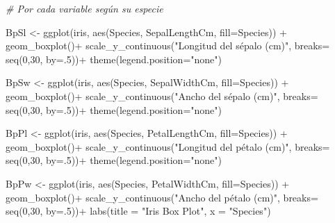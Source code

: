 \documentclass[
]{article}
\newenvironment{Shaded}{\begin{snugshade}}{\end{snugshade}}
\newcommand{\AttributeTok}[1]{\textcolor[rgb]{0.77,0.63,0.00}{#1}}
\newcommand{\CommentTok}[1]{\textcolor[rgb]{0.56,0.35,0.01}{\textit{#1}}}
\newcommand{\DecValTok}[1]{\textcolor[rgb]{0.00,0.00,0.81}{#1}}
\newcommand{\FunctionTok}[1]{\textcolor[rgb]{0.00,0.00,0.00}{#1}}
\newcommand{\NormalTok}[1]{#1}
\newcommand{\OtherTok}[1]{\textcolor[rgb]{0.56,0.35,0.01}{#1}}
\newcommand{\SpecialCharTok}[1]{\textcolor[rgb]{0.00,0.00,0.00}{#1}}
\newcommand{\StringTok}[1]{\textcolor[rgb]{0.31,0.60,0.02}{#1}}
\begin{document}
\begin{Shaded}
\begin{Highlighting}[]
\CommentTok{\# Por cada variable según su especie}

\NormalTok{BpSl }\OtherTok{\textless{}{-}} \FunctionTok{ggplot}\NormalTok{(iris, }\FunctionTok{aes}\NormalTok{(Species, SepalLengthCm, }\AttributeTok{fill=}\NormalTok{Species)) }\SpecialCharTok{+} 
  \FunctionTok{geom\_boxplot}\NormalTok{()}\SpecialCharTok{+}
  \FunctionTok{scale\_y\_continuous}\NormalTok{(}\StringTok{"Longitud del sépalo (cm)"}\NormalTok{, }\AttributeTok{breaks=} \FunctionTok{seq}\NormalTok{(}\DecValTok{0}\NormalTok{,}\DecValTok{30}\NormalTok{, }\AttributeTok{by=}\NormalTok{.}\DecValTok{5}\NormalTok{))}\SpecialCharTok{+}
  \FunctionTok{theme}\NormalTok{(}\AttributeTok{legend.position=}\StringTok{"none"}\NormalTok{)}

\NormalTok{BpSw }\OtherTok{\textless{}{-}}  \FunctionTok{ggplot}\NormalTok{(iris, }\FunctionTok{aes}\NormalTok{(Species, SepalWidthCm, }\AttributeTok{fill=}\NormalTok{Species)) }\SpecialCharTok{+} 
  \FunctionTok{geom\_boxplot}\NormalTok{()}\SpecialCharTok{+}
  \FunctionTok{scale\_y\_continuous}\NormalTok{(}\StringTok{"Ancho del sépalo (cm)"}\NormalTok{, }\AttributeTok{breaks=} \FunctionTok{seq}\NormalTok{(}\DecValTok{0}\NormalTok{,}\DecValTok{30}\NormalTok{, }\AttributeTok{by=}\NormalTok{.}\DecValTok{5}\NormalTok{))}\SpecialCharTok{+}
  \FunctionTok{theme}\NormalTok{(}\AttributeTok{legend.position=}\StringTok{"none"}\NormalTok{)}

\NormalTok{BpPl }\OtherTok{\textless{}{-}} \FunctionTok{ggplot}\NormalTok{(iris, }\FunctionTok{aes}\NormalTok{(Species, PetalLengthCm, }\AttributeTok{fill=}\NormalTok{Species)) }\SpecialCharTok{+} 
  \FunctionTok{geom\_boxplot}\NormalTok{()}\SpecialCharTok{+}
  \FunctionTok{scale\_y\_continuous}\NormalTok{(}\StringTok{"Longitud del pétalo (cm)"}\NormalTok{, }\AttributeTok{breaks=} \FunctionTok{seq}\NormalTok{(}\DecValTok{0}\NormalTok{,}\DecValTok{30}\NormalTok{, }\AttributeTok{by=}\NormalTok{.}\DecValTok{5}\NormalTok{))}\SpecialCharTok{+}
  \FunctionTok{theme}\NormalTok{(}\AttributeTok{legend.position=}\StringTok{"none"}\NormalTok{)}

\NormalTok{BpPw }\OtherTok{\textless{}{-}}  \FunctionTok{ggplot}\NormalTok{(iris, }\FunctionTok{aes}\NormalTok{(Species, PetalWidthCm, }\AttributeTok{fill=}\NormalTok{Species)) }\SpecialCharTok{+} 
  \FunctionTok{geom\_boxplot}\NormalTok{()}\SpecialCharTok{+}
  \FunctionTok{scale\_y\_continuous}\NormalTok{(}\StringTok{"Ancho del pétalo (cm)"}\NormalTok{, }\AttributeTok{breaks=} \FunctionTok{seq}\NormalTok{(}\DecValTok{0}\NormalTok{,}\DecValTok{30}\NormalTok{, }\AttributeTok{by=}\NormalTok{.}\DecValTok{5}\NormalTok{))}\SpecialCharTok{+}
  \FunctionTok{labs}\NormalTok{(}\AttributeTok{title =} \StringTok{"Iris Box Plot"}\NormalTok{, }\AttributeTok{x =} \StringTok{"Species"}\NormalTok{)}


\end{Highlighting}
\end{Shaded}
\end{document}

